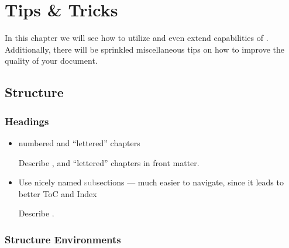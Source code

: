 \chapter{Tips \& Tricks} \label{ch:Tips}

In this chapter we will see how to utilize and even extend capabilities of \TeXtured{}.
Additionally, there will be sprinkled miscellaneous tips on how to improve the quality of your document.

\section{Structure}%
\label{sec:Structure}

\subsection{Headings}%
\label{sub:Headings}

\begin{itemize}
    \item numbered and \enquote{lettered} chapters
          \begin{Todo}
              Describe \custommacro{\chapternotnumbered}, and \enquote{lettered} chapters in front matter.
          \end{Todo}
    \item Use nicely named \textcolor{gray}{sub}sections --- much easier to navigate, since it leads to better ToC and Index
          \begin{Todo}
              Describe \macro{\texorpdfstring}.
          \end{Todo}
\end{itemize}

\subsection{Structure Environments}%
\label{sub:Structure Environments tips}

